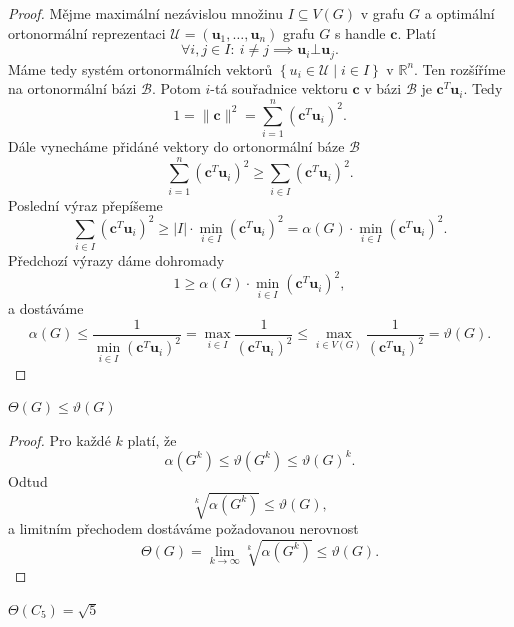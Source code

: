 \begin{proof}
    Mějme maximální nezávislou množinu $I \subseteq V(G)$ v grafu $G$ a optimální ortonormální reprezentaci $\mathcal{U} = \left(\mathbf{u}_1, \dots, \mathbf{u}_n \right)$ grafu $G$ s handle $\mathbf{c}$. Platí
    $$
        \forall i,j \in I:\ i \neq j \implies \mathbf{u}_i \bot \mathbf{u}_j.
    $$
    Máme tedy systém ortonormálních vektorů $\left\{ u_i \in \mathcal{U} \mid i \in I \right\}$ v $\mathbb{R}^n$. Ten rozšíříme na ortonormální bázi $\mathcal{B}$. Potom $i$-tá souřadnice vektoru $\mathbf{c}$ v bázi $\mathcal{B}$ je $\mathbf{c}^T \mathbf{u}_i$. Tedy
    $$
        1 = \|\mathbf{c}\|^2 = \sum_{i=1}^n \left( \mathbf{c}^T \mathbf{u}_i \right)^2.
    $$
    Dále vynecháme přidáné vektory do ortonormální báze $\mathcal{B}$
    $$
        \sum_{i=1}^n \left( \mathbf{c}^T \mathbf{u}_i \right)^2 \geq \sum_{i \in I} \left( \mathbf{c}^T \mathbf{u}_i \right)^2.
    $$
    Poslední výraz přepíšeme
    $$
        \sum_{i \in I} \left( \mathbf{c}^T \mathbf{u}_i \right)^2 \geq |I| \cdot \min_{i \in I}\left( \mathbf{c}^T \mathbf{u}_i \right)^2 = \alpha(G) \cdot \min_{i \in I}\left( \mathbf{c}^T \mathbf{u}_i \right)^2.
    $$
    Předchozí výrazy dáme dohromady
    $$
        1 \geq \alpha(G) \cdot \min_{i \in I}\left( \mathbf{c}^T \mathbf{u}_i \right)^2,
    $$
    a dostáváme
    $$
        \alpha(G) \leq \frac{1}{\min_{i \in I}\left( \mathbf{c}^T \mathbf{u}_i \right)^2} = \max_{i \in I} \frac{1}{\left( \mathbf{c}^T \mathbf{u}_i \right)^2} \leq \max_{i \in V(G)} \frac{1}{\left( \mathbf{c}^T \mathbf{u}_i \right)^2} = \vartheta(G).
    $$
\end{proof}

\begin{lm}
    $\Theta(G) \leq \vartheta(G)$
\end{lm}

\begin{proof}
    Pro každé $k$ platí, že
    $$
        \alpha(G^k) \leq \vartheta(G^k) \leq \vartheta(G)^k.
    $$
    Odtud
    $$
        \sqrt[k]{\alpha(G^k)} \leq \vartheta(G),
    $$
    a limitním přechodem dostáváme požadovanou nerovnost
    $$
        \Theta(G) = \lim_{k \to \infty} \sqrt[k]{\alpha(G^k)} \leq \vartheta(G).
    $$
\end{proof}

\begin{vt}
    $\Theta(C_5) = \sqrt{5}$
\end{vt}


